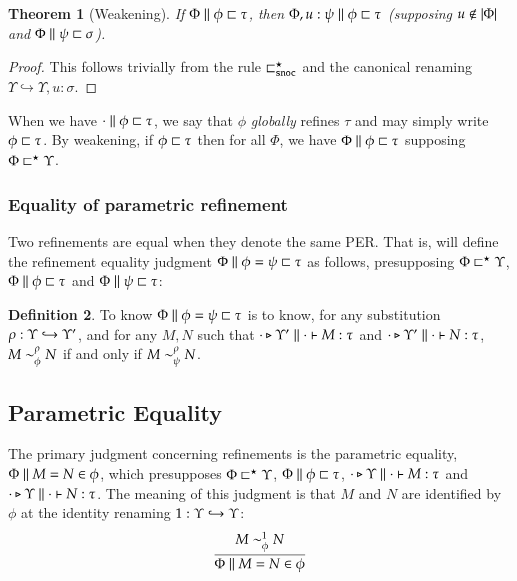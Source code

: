 \documentclass[11pt]{article}
\newtheorem{thm}{Theorem}[section]
\theoremstyle{definition}
\newtheorem{definition}[thm]{Definition}
\theoremstyle{remark}
\numberwithin{equation}{section}
\def\IModeColorName{MidnightBlue}
\def\OModeColorName{Maroon}
\def\IModeColorName{Black}
\def\OModeColorName{Black}
\newcommand\IMode[1]{{\color{\IModeColorName}{#1}}}
\newcommand\OMode[1]{{\color{\OModeColorName}{#1}}}
\newcommand\Of[2]{\IMode{#1}: \IMode{#2}}
\newcommand\IsAbt[5]{%
  \IMode{#1}\triangleright%
  \IMode{#2}\parallel%
  \IMode{#3}\vdash%
  \IMode{#4}:\OMode{#5}%
}
\newcommand\Dom[1]{\left\vert#1\right\vert}
\newcommand\NotIn[2]{\IMode{#1}\notin\IMode{#2}}
\newcommand\Refines[3]{\IMode{#1}\parallel \IMode{#2} \sqsubset \OMode{#3}}
\newcommand\GRefines[2]{\IMode{#1}\sqsubset\OMode{#2}}
\newcommand\RefinesCtx[2]{\IMode{#1}\sqsubset^\star\OMode{#2}}
\newcommand\EqRefines[4]{\IMode{#1}\parallel\IMode{#2}=\IMode{#3}\sqsubset\OMode{#4}}
\newcommand\RMemEq[4]{\IMode{#1}\parallel \IMode{#2}=\IMode{#3}\in \IMode{#4}}
\begin{document}
\begin{thm}[Weakening]
  If $\Refines{\Phi}{\phi}{\tau}$, then $\Refines{\Phi,u:\psi}{\phi}{\tau}$ (supposing
  $\NotIn{u}{\Dom\Phi}$ and $\Refines{\Phi}{\psi}{\sigma}$).
\end{thm}
\begin{proof}
  This follows trivially from the rule $\sqsubset^\star_{\mathtt{snoc}}$ and the canonical renaming
  $\Upsilon\hookrightarrow\Upsilon,u:\sigma$.
\end{proof}

When we have $\Refines{\cdot}{\phi}{\tau}$, we say that $\phi$ \emph{globally}
refines $\tau$ and may simply write $\GRefines{\phi}{\tau}$. By weakening, if
$\GRefines{\phi}{\tau}$ then for all $\Phi$, we have
$\Refines{\Phi}{\phi}{\tau}$ supposing $\RefinesCtx{\Phi}{\Upsilon}$.

\subsubsection{Equality of parametric refinement}

Two refinements are equal when they denote the same PER. That is, will define
the refinement equality judgment $\EqRefines{\Phi}{\phi}{\psi}{\tau}$ as
follows, presupposing $\RefinesCtx{\Phi}{\Upsilon}$,
$\Refines{\Phi}{\phi}{\tau}$ and $\Refines{\Phi}{\psi}{\tau}$:
\begin{definition}
  To know $\EqRefines{\Phi}{\phi}{\psi}{\tau}$ is to know, for any substitution
  $\Of{\rho}{\Upsilon\hookrightarrow\OMode{\Upsilon'}}$, and for any $M, N$
  such that $\IsAbt{\cdot}{\Upsilon'}{\cdot}{M}{\tau}$ and
  $\IsAbt{\cdot}{\Upsilon'}{\cdot}{N}{\tau}$,
  $\IMode{M}\sim^\rho_\phi\IMode{N}$ if and only if
  $\IMode{M}\sim^\rho_\psi\IMode{N}$.
\end{definition}

\subsection{Parametric Equality}

The primary judgment concerning refinements is the parametric equality,
$\RMemEq{\Phi}{M}{N}{\phi}$, which presupposes $\RefinesCtx{\Phi}{\Upsilon}$,
$\Refines{\Phi}{\phi}{\tau}$, $\IsAbt{\cdot}{\Upsilon}{\cdot}{M}{\tau}$ and
$\IsAbt{\cdot}{\Upsilon}{\cdot}{N}{\tau}$. The meaning of this judgment is that
$M$ and $N$ are identified by $\phi$ at the identity renaming
$\Of{1}{\IMode{\Upsilon}\hookrightarrow\OMode{\Upsilon}}$:
\[
  \infer{
    \RMemEq{\Phi}{M}{N}{\phi}
  }{
    \IMode{M}\sim^1_\phi\IMode{N}
  }
\]
\end{document}

